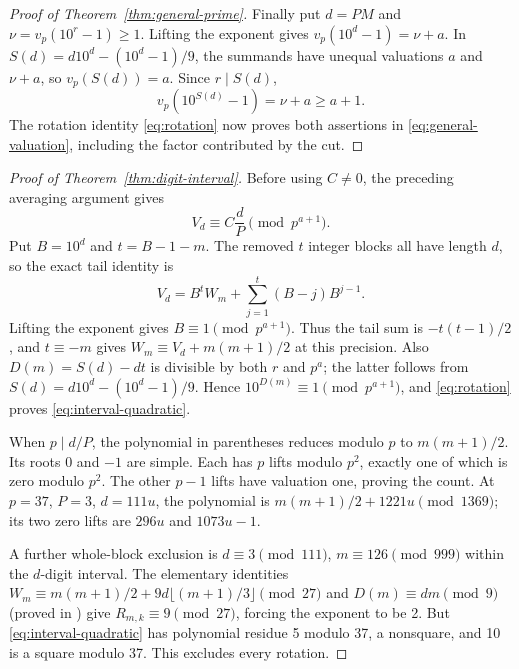 \documentclass[10pt]{article}
\begin{document}
\begin{proof}[Proof of Theorem~\ref{thm:general-prime}]
Finally put $d=PM$ and $\nu=v_p(10^r-1)\ge1$.
Lifting the exponent gives $v_p(10^d-1)=\nu+a$.
In $S(d)=d10^d-(10^d-1)/9$, the summands have unequal valuations
$a$ and $\nu+a$, so $v_p(S(d))=a$. Since $r\mid S(d)$,
\[
 v_p(10^{S(d)}-1)=\nu+a\ge a+1.
\]
The rotation identity \eqref{eq:rotation} now proves both assertions in
\eqref{eq:general-valuation}, including the factor contributed by the cut.
\end{proof}

\begin{proof}[Proof of Theorem~\ref{thm:digit-interval}]
Before using $C\ne0$, the preceding averaging argument gives
\[
 V_d\equiv C\frac dP\pmod{p^{a+1}}.
\]
Put $B=10^d$ and $t=B-1-m$. The removed $t$ integer blocks all have length $d$,
so the exact tail identity is
\[
 V_d=B^tW_m+\sum_{j=1}^t(B-j)B^{j-1}.
\]
Lifting the exponent gives $B\equiv1\pmod{p^{a+1}}$.
Thus the tail sum is $-t(t-1)/2$, and $t\equiv-m$ gives
$W_m\equiv V_d+m(m+1)/2$ at this precision.
Also $D(m)=S(d)-dt$ is divisible by both $r$ and $p^a$;
the latter follows from $S(d)=d10^d-(10^d-1)/9$.
Hence $10^{D(m)}\equiv1\pmod{p^{a+1}}$, and
\eqref{eq:rotation} proves \eqref{eq:interval-quadratic}.

When $p\mid d/P$, the polynomial in parentheses reduces modulo $p$ to
$m(m+1)/2$. Its roots 0 and $-1$ are simple. Each has $p$ lifts modulo
$p^2$, exactly one of which is zero modulo $p^2$. The other $p-1$ lifts
have valuation one, proving the count. At $p=37$, $P=3$, $d=111u$, the
polynomial is $m(m+1)/2+1221u\pmod{1369}$; its two zero lifts are
$296u$ and $1073u-1$.

A further whole-block exclusion is
$d\equiv3\pmod{111}$, $m\equiv126\pmod{999}$ within the $d$-digit interval.
The elementary identities
$W_m\equiv m(m+1)/2+9d\lfloor(m+1)/3\rfloor\pmod{27}$ and
$D(m)\equiv dm\pmod9$ (proved in ) give
$R_{m,k}\equiv9\pmod{27}$, forcing the exponent to be 2.
But \eqref{eq:interval-quadratic} has polynomial residue 5 modulo 37,
a nonsquare, and 10 is a square modulo 37. This excludes every rotation.
\end{proof}
\end{document}
